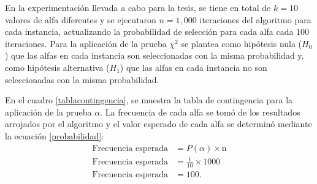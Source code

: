 \documentclass{article}
\begin{document}
En la experimentación llevada a cabo para la tesis, se tiene en total de $k=10$ valores de alfa diferentes y se ejecutaron $n=1,000$ iteraciones del algoritmo para cada instancia, actualizando la probabilidad de selección para cada alfa cada $100$ iteraciones. Para la aplicación de la prueba $\chi^2$ se plantea como hipótesis nula ($H_{0}$) que las alfas en cada instancia son seleccionadas con la misma probabilidad y, como hipótesis alternativa ($H_{1}$) que las alfas en cada instancia no son seleccionadas con la misma probabilidad.

En el cuadro \ref{tablacontingencia}, se muestra la tabla de contingencia para la aplicación de la prueba $\alpha$. La frecuencia de cada alfa se tomó de los resultados arrojados por el algoritmo y el valor esperado de cada alfa se determinó mediante la ecuación \ref{probabilidad}:
\begin{align} 
  \text{Frecuencia esperada} & = P(\alpha) \times \text{n} \label{probabilidad} \\ 
    \text{Frecuencia esperada} & = \frac{1}{10} \times 1000 \\  \nonumber
    \text{Frecuencia esperada} & = 100. \\  \nonumber
\end{align}
\end{document}
